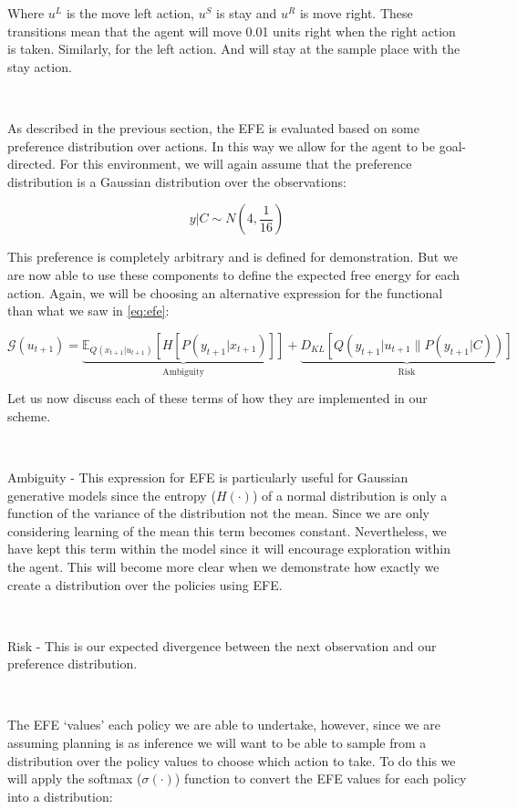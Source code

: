 \documentclass{article}
\begin{document}
Where $u^L$ is the move left action, $u^S$ is stay and $u^R$ is move right. These transitions mean that the agent will move 0.01 units right when the right action is taken. Similarly, for the left action. And will stay at the sample place with the stay action. 

\

As described in the previous section, the EFE is evaluated based on some preference distribution over actions. In this way we allow for the agent to be goal-directed. For this environment, we will again assume that the preference distribution is a Gaussian distribution over the observations:

\begin{equation}
	y | C \sim N(4, \frac{1}{16})
\end{equation}

This preference is completely arbitrary and is defined for demonstration. But we are now able to use these components to define the expected free energy for each action. Again, we will be choosing an alternative expression for the functional than what we saw in \ref{eq:efe}:

\begin{equation}\label{eq:efe_thermostat}
	\mathcal{G}(u_{t+1}) = \underbrace{\mathbb{E}_{Q(x_{t+1} | u_{t+1})} \left[ H[ P(y_{t+1} | x_{t+1}) ] \right]}_{\text{Ambiguity}} + \underbrace{D_{KL}\left[ Q(y_{t+1} | u_{t+1} \| P(y_{t+1} | C)) \right]}_{\text{Risk}}
\end{equation}

Let us now discuss each of these terms of how they are implemented in our scheme.

\

Ambiguity - This expression for EFE is particularly useful for Gaussian generative models since the entropy ($H(\cdot)$) of a normal distribution is only a function of the variance of the distribution not the mean. Since we are only considering learning of the mean this term becomes constant. Nevertheless, we have kept this term within the model since it will encourage exploration within the agent. This will become more clear when we demonstrate how exactly we create a distribution over the policies using EFE.

\

Risk - This is our expected divergence between the next observation and our preference distribution.

\

The EFE `values' each policy we are able to undertake, however, since we are assuming planning is as inference we will want to be able to sample from a distribution over the policy values to choose which action to take. To do this we will apply the softmax ($\sigma(\cdot)$) function to convert the EFE values for each policy into a distribution:
\end{document}
